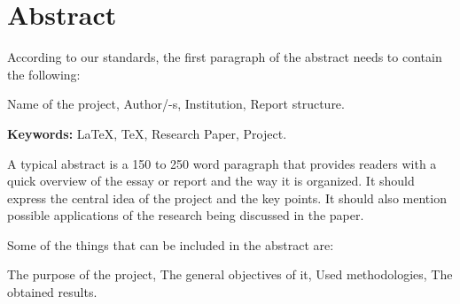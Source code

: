 \chapter*{Abstract}
\par According to our standards, the first paragraph of the abstract needs to contain the following:
\begin{itemize}
    \hitem Name of the project,
    \hitem Author/-s,
    \hitem Institution,
    \hitem Report structure.
\end{itemize}
\par \textbf{Keywords: } \LaTeX, \TeX, Research Paper, Project.
\par A typical abstract is a 150 to 250 word paragraph that provides readers with a quick overview of the essay or report and the way it is organized. It should express the central idea of the project and the key points. It should also mention possible applications of the research being discussed in the paper.
\par Some of the things that can be included in the abstract are:
\begin{itemize}
    \hitem The purpose of the project,
    \hitem The general objectives of it,
    \hitem Used methodologies,
    \hitem The obtained results.
\end{itemize}

\clearpage